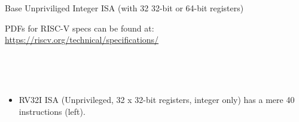 \documentclass{article}
\newcommand{\hm}{\hspace*{1em}}
\newcommand{\hmm}{\hspace*{2em}}
\begin{document}

\begin{center}
{\Huge
  Base Unpriviliged Integer ISA (with 32 32-bit or 64-bit registers)}

\vspace*{1ex}

PDFs for RISC-V specs can be found at: \url{https://riscv.org/technical/specifications/}

\vspace*{1ex}

\vfill

\begin{minipage}[t]{5in}
  \hmm \\
\end{minipage}
\hm
\begin{minipage}[t]{6in}
  \hmm \\
  \begin{itemize}\large

  \item RV32I ISA (Unprivileged, 32 x 32-bit registers, integer only)
    has a mere 40 instructions (left).


\end{itemize}
\end{minipage}
\end{center}
\end{document}
